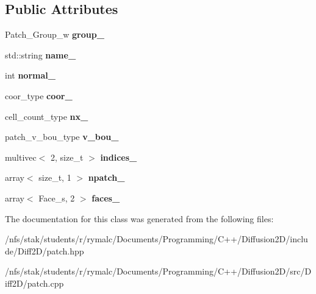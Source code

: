 \subsection*{Public Attributes}
\begin{DoxyCompactItemize}
\item 
\hypertarget{classPatch_a93fff2891647c4109c16cb4ec2079545}{
Patch\_\-Group\_\-w {\bfseries group\_\-}}
\label{classPatch_a93fff2891647c4109c16cb4ec2079545}

\item 
\hypertarget{classPatch_a133d268d88897aef8b20ca7da98b9cdb}{
std::string {\bfseries name\_\-}}
\label{classPatch_a133d268d88897aef8b20ca7da98b9cdb}

\item 
\hypertarget{classPatch_a01951c7c7aec32d184e11869ab23877d}{
int {\bfseries normal\_\-}}
\label{classPatch_a01951c7c7aec32d184e11869ab23877d}

\item 
\hypertarget{classPatch_a3beca2ce16697d8e8097ba92ee6bdc29}{
coor\_\-type {\bfseries coor\_\-}}
\label{classPatch_a3beca2ce16697d8e8097ba92ee6bdc29}

\item 
\hypertarget{classPatch_aa69a7e422610ce91ad4fb60c88cadbf0}{
cell\_\-count\_\-type {\bfseries nx\_\-}}
\label{classPatch_aa69a7e422610ce91ad4fb60c88cadbf0}

\item 
\hypertarget{classPatch_aea44744ce3a7d51831f67014bc89867d}{
patch\_\-v\_\-bou\_\-type {\bfseries v\_\-bou\_\-}}
\label{classPatch_aea44744ce3a7d51831f67014bc89867d}

\item 
\hypertarget{classPatch_af272c0110d640ddd191492fc9cc62990}{
multivec$<$ 2, size\_\-t $>$ {\bfseries indices\_\-}}
\label{classPatch_af272c0110d640ddd191492fc9cc62990}

\item 
\hypertarget{classPatch_aaa96294c5c204449ca53209b040ae06c}{
array$<$ size\_\-t, 1 $>$ {\bfseries npatch\_\-}}
\label{classPatch_aaa96294c5c204449ca53209b040ae06c}

\item 
\hypertarget{classPatch_a6d0bbabb9b7b1928bda12255b312fedd}{
array$<$ Face\_\-s, 2 $>$ {\bfseries faces\_\-}}
\label{classPatch_a6d0bbabb9b7b1928bda12255b312fedd}

\end{DoxyCompactItemize}


The documentation for this class was generated from the following files:\begin{DoxyCompactItemize}
\item 
/nfs/stak/students/r/rymalc/Documents/Programming/C++/Diffusion2D/include/Diff2D/patch.hpp\item 
/nfs/stak/students/r/rymalc/Documents/Programming/C++/Diffusion2D/src/Diff2D/patch.cpp\end{DoxyCompactItemize}
